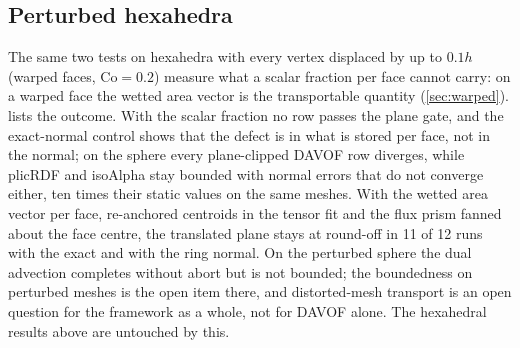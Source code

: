 \subsection{Perturbed hexahedra}
\label{sec:tpf-perturbed}

The same two tests on hexahedra with every vertex displaced by up to $0.1h$ (warped faces, $\mathrm{Co} = 0.2$) measure what a scalar fraction per face cannot carry: on a warped face the wetted area vector is the transportable quantity (\cref{sec:warped}).  lists the outcome. With the scalar fraction no row passes the plane gate, and the exact-normal control shows that the defect is in what is stored per face, not in the normal; on the sphere every plane-clipped DAVOF row diverges, while plicRDF and isoAlpha stay bounded with normal errors that do not converge either, ten times their static values on the same meshes. With the wetted area vector per face, re-anchored centroids in the tensor fit and the flux prism fanned about the face centre, the translated plane stays at round-off in 11 of 12 runs with the exact and with the ring normal. On the perturbed sphere the dual advection completes without abort but is not bounded; the boundedness on perturbed meshes is the open item there, and distorted-mesh transport is an open question for the framework as a whole, not for DAVOF alone. The hexahedral results above are untouched by this.

